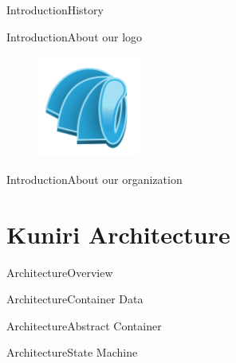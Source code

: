 \documentclass[10pt]{beamer}
\begin{document}
\begin{frame}{Introduction}{History}
\end{frame}

\begin{frame}{Introduction}{About our logo}
  \begin{figure}[overview]
    \includegraphics[width=0.3\textwidth]{images/kuniri.png}
  \end{figure}
\end{frame}

\begin{frame}{Introduction}{About our organization}

\end{frame}

\section{Kuniri Architecture}
\begin{frame}{Architecture}{Overview}
\end{frame}

\begin{frame}{Architecture}{Container Data}
\end{frame}

\begin{frame}{Architecture}{Abstract Container}
\end{frame}

\begin{frame}{Architecture}{State Machine}
\end{frame}

\end{document}
